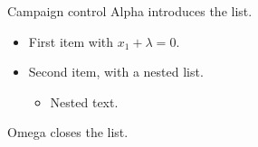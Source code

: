\documentclass[14pt,aspectratio=169]{beamer}
\date{}
\begin{document}
\begin{frame}{Campaign control}
Alpha introduces the list.
\begin{itemize}
\item First item with $x_1+\lambda=0$.
\item Second item, with a nested list.
\begin{itemize}\item Nested text.\end{itemize}
\end{itemize}
Omega closes the list.
\end{frame}
\end{document}
